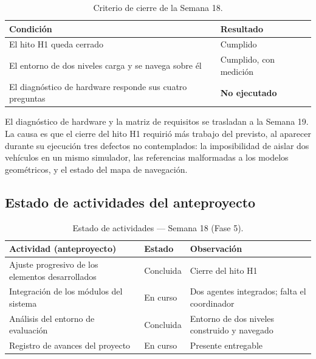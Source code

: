 \documentclass[12pt,letterpaper]{article}
\begin{document}
\begin{table}[H]
    \centering
    \small
    \caption{Criterio de cierre de la Semana 18.}
    \label{tab:cierre}
    \begin{tabular}{@{}p{8.5cm}p{5.0cm}@{}}
        \toprule
        \textbf{Condición} & \textbf{Resultado} \\ \midrule
        El hito H1 queda cerrado & Cumplido \\
        El entorno de dos niveles carga y se navega sobre él & Cumplido, con medición \\
        El diagnóstico de hardware responde sus cuatro preguntas & \textbf{No ejecutado} \\ \bottomrule
    \end{tabular}
\end{table}

El diagnóstico de hardware y la matriz de requisitos se trasladan a la Semana 19. La causa es que el cierre del hito H1 requirió más trabajo del previsto, al aparecer durante su ejecución tres defectos no contemplados: la imposibilidad de aislar dos vehículos en un mismo simulador, las referencias malformadas a los modelos geométricos, y el estado del mapa de navegación.

\subsection{Estado de actividades del anteproyecto}

\begin{table}[H]
    \centering
    \small
    \caption{Estado de actividades --- Semana 18 (Fase 5).}
    \label{tab:estado_s18}
    \begin{tabular}{@{}p{6.3cm}ll@{}}
        \toprule
        \textbf{Actividad (anteproyecto)} & \textbf{Estado} & \textbf{Observación} \\ \midrule
        Ajuste progresivo de los elementos desarrollados & Concluida & Cierre del hito H1 \\ \addlinespace
        Integración de los módulos del sistema & En curso & Dos agentes integrados; falta el coordinador \\ \addlinespace
        Análisis del entorno de evaluación & Concluida & Entorno de dos niveles construido y navegado \\ \addlinespace
        Registro de avances del proyecto & En curso & Presente entregable \\ \bottomrule
    \end{tabular}
\end{table}
\end{document}
